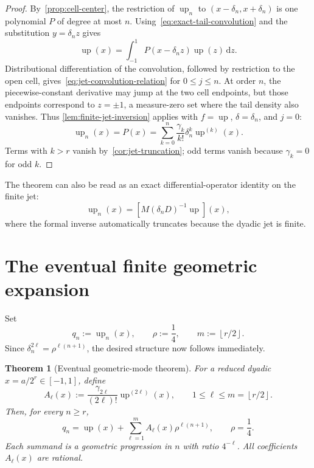 \documentclass[11pt,a4paper]{article}
\newtheorem{theorem}{Theorem}[section]
\theoremstyle{remark}
\newcommand{\dd}{\,\mathrm{d}}
\newcommand{\up}{\operatorname{up}}
\newcommand{\floor}[1]{\left\lfloor #1\right\rfloor}
\begin{document}
\begin{proof}
By~\cref{prop:cell-center}, the restriction of $\up_n$ to
$(x-\delta_n,x+\delta_n)$ is one polynomial $P$ of degree at most $n$.
Using~\eqref{eq:exact-tail-convolution} and the substitution
$y=\delta_nz$ gives
\begin{equation}
 \up(x)=\int_{-1}^{1}P(x-\delta_nz)\up(z)\dd z.
 \label{eq:local-convolution-value}
\end{equation}
Distributional differentiation of the convolution, followed by restriction
to the open cell, gives~\eqref{eq:jet-convolution-relation} for
$0\le j\le n$.  At order $n$, the piecewise-constant derivative may jump at
the two cell endpoints, but those endpoints correspond to $z=\pm1$, a
measure-zero set where the tail density also vanishes.  Thus
\cref{lem:finite-jet-inversion} applies with $f=\up$, $\delta=\delta_n$, and
$j=0$:
\[
 \up_n(x)=P(x)=\sum_{k=0}^{n}\frac{\gamma_k}{k!}
 \delta_n^k\up^{(k)}(x).
\]
Terms with $k>r$ vanish by~\cref{cor:jet-truncation}; odd terms vanish because
$\gamma_k=0$ for odd $k$.
\end{proof}

The theorem can also be read as an exact differential-operator identity on the
finite jet:
\begin{equation}
 \up_n(x)=\left[M(\delta_nD)^{-1}\up\right](x),
 \label{eq:differential-operator-symbol}
\end{equation}
where the formal inverse automatically truncates because the dyadic jet is
finite.

\section{The eventual finite geometric expansion}
\label{sec:eventual-expansion}

Set
\begin{equation}
 q_n:=\up_n(x),\qquad
 \rho:=\frac14,
 \qquad m:=\floor{r/2}.
 \label{eq:qnrhom}
\end{equation}
Since $\delta_n^{2\ell}=\rho^{\ell(n+1)}$, the desired structure now follows
immediately.

\begin{theorem}[Eventual geometric-mode theorem]
\label{thm:eventual-geometric}
For a reduced dyadic $x=a/2^r\in[-1,1]$, define
\begin{equation}
 A_\ell(x):=\frac{\gamma_{2\ell}}{(2\ell)!}\up^{(2\ell)}(x),
 \qquad 1\le\ell\le m=\floor{r/2}.
 \label{eq:mode-coefficients}
\end{equation}
Then, for every $n\ge r$,
\begin{equation}
 \boxed{
 q_n=\up(x)+\sum_{\ell=1}^{m}A_\ell(x)\rho^{\ell(n+1)},
 \qquad \rho=\frac14. }
 \label{eq:eventual-geometric}
\end{equation}
Each summand is a geometric progression in $n$ with ratio $4^{-\ell}$.
All coefficients $A_\ell(x)$ are rational.
\end{theorem}
\end{document}
